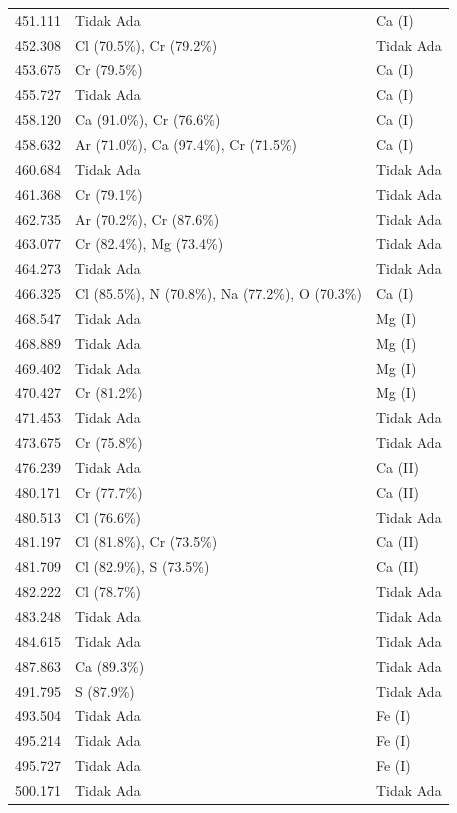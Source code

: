 \begin{onehalfspace}
\begin{longtable}{p{} p{} p{}}
    451.111 & Tidak Ada & Ca (I) \\
    452.308 & Cl (70.5\%), Cr (79.2\%) & Tidak Ada \\
    453.675 & Cr (79.5\%) & Ca (I) \\
    455.727 & Tidak Ada & Ca (I) \\
    458.120 & Ca (91.0\%), Cr (76.6\%) & Ca (I) \\
    458.632 & Ar (71.0\%), Ca (97.4\%), Cr (71.5\%) & Ca (I) \\
    460.684 & Tidak Ada & Tidak Ada \\
    461.368 & Cr (79.1\%) & Tidak Ada \\
    462.735 & Ar (70.2\%), Cr (87.6\%) & Tidak Ada \\
    463.077 & Cr (82.4\%), Mg (73.4\%) & Tidak Ada \\
    464.273 & Tidak Ada & Tidak Ada \\
    466.325 & Cl (85.5\%), N (70.8\%), Na (77.2\%), O (70.3\%) & Ca (I) \\
    468.547 & Tidak Ada & Mg (I) \\
    468.889 & Tidak Ada & Mg (I) \\
    469.402 & Tidak Ada & Mg (I) \\
    470.427 & Cr (81.2\%) & Mg (I) \\
    471.453 & Tidak Ada & Tidak Ada \\
    473.675 & Cr (75.8\%) & Tidak Ada \\
    476.239 & Tidak Ada & Ca (II) \\
    480.171 & Cr (77.7\%) & Ca (II) \\
    480.513 & Cl (76.6\%) & Tidak Ada \\
    481.197 & Cl (81.8\%), Cr (73.5\%) & Ca (II) \\
    481.709 & Cl (82.9\%), S (73.5\%) & Ca (II) \\
    482.222 & Cl (78.7\%) & Tidak Ada \\
    483.248 & Tidak Ada & Tidak Ada \\
    484.615 & Tidak Ada & Tidak Ada \\
    487.863 & Ca (89.3\%) & Tidak Ada \\
    491.795 & S (87.9\%) & Tidak Ada \\
    493.504 & Tidak Ada & Fe (I) \\
    495.214 & Tidak Ada & Fe (I) \\
    495.727 & Tidak Ada & Fe (I) \\
    500.171 & Tidak Ada & Tidak Ada \\

\end{longtable}
\end{onehalfspace}
